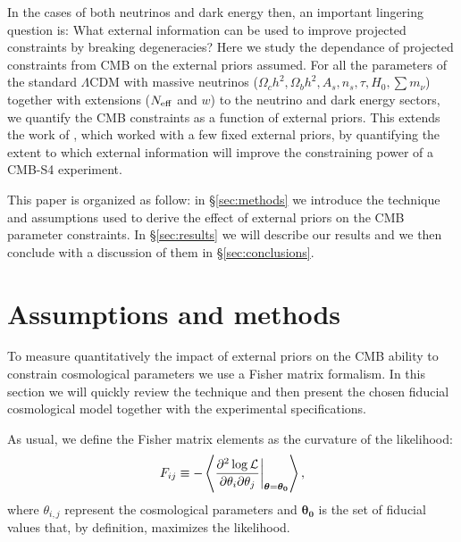 \documentclass[aps,prd,reprint,superscriptaddress]{revtex4-1}
\newcommand\refsec[1]{\S\ref{sec:#1}}
\begin{document}
In the cases of both neutrinos and dark energy then, an important lingering question is: What external information can be used to improve projected constraints by breaking degeneracies?
Here we study the dependance of projected constraints from CMB on the external priors assumed. For all the parameters of the standard $\Lambda$CDM with massive neutrinos ($\Omega_ch^2, \Omega_bh^2, A_s, n_s, \tau, H_0, \sum m_\nu$) together with extensions ($N_{\rm eff}$ and $w$) to the neutrino and dark energy sectors, we quantify the CMB constraints as a function of external priors. This extends the work of \citet{wu:2014}, which worked with a few fixed external priors, by quantifying the extent to which external information will improve the constraining power of a CMB-S4 experiment. 

This paper is organized as follow: in \refsec{methods} we introduce the technique and assumptions used to derive the effect of external priors on the CMB parameter constraints. In \refsec{results} we will describe our results and we then conclude with a discussion of them in \refsec{conclusions}.



\section{Assumptions and methods \label{sec:methods}}


To measure quantitatively the impact of external priors on the CMB ability to constrain cosmological parameters we use a Fisher matrix formalism. In this section we will quickly review the technique and then present the chosen fiducial cosmological model together with the experimental specifications.

As usual, we define the Fisher matrix elements as the curvature of the likelihood:
\begin{equation}
	\centering
		F_{ij} \equiv - \left\langle\frac{\partial^2 \log \mathcal{L}}{\partial \theta_i \partial \theta_j} \bigg|_{\boldsymbol{\theta} = \boldsymbol{\theta_0}}\right\rangle,
	\label{eqn:Fij_def}
\end{equation}
where $\theta_{i,j}$ represent the cosmological parameters and $\boldsymbol{\theta_0}$ is the set of fiducial values that, by definition, maximizes the likelihood. 
\end{document}
